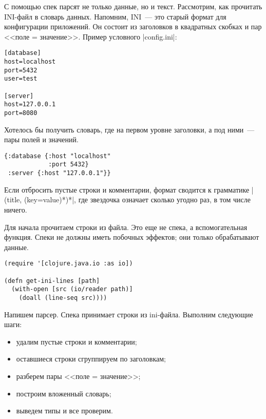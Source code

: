 С помощью спек парсят не только данные, но и текст. Рассмотрим, как прочитать
INI-файл в словарь данных. Напомним, INI~--- это старый формат для конфигурации
приложений. Он состоит из заголовков в квадратных скобках и пар <<поле =
значение>>. Пример условного \spverb|config.ini|:

\begin{verbatim}
[database]
host=localhost
port=5432
user=test

[server]
host=127.0.0.1
port=8080
\end{verbatim}

Хотелось бы получить словарь, где на первом уровне заголовки, а под ними~---
пары полей и значений.

\begin{verbatim}
{:database {:host "localhost"
            :port 5432}
 :server {:host "127.0.0.1"}}
\end{verbatim}

Если отбросить пустые строки и комментарии, формат сводится к грамматике
\spverb|(title, (key=value)*)*|, где звездочка означает сколько угодно раз, в
том числе ничего.

Для начала прочитаем строки из файла. Это еще не спека, а вспомогательная
функция. Спеки не должны иметь побочных эффектов; они только обрабатывают
данные.

\begin{verbatim}
(require '[clojure.java.io :as io])

(defn get-ini-lines [path]
  (with-open [src (io/reader path)]
    (doall (line-seq src))))
\end{verbatim}

Напишем парсер. Спека принимает строки из ini-файла. Выполним следующие шаги:

\begin{itemize}

\item
  удалим пустые строки и комментарии;

\item
  оставшиеся строки сгруппируем по заголовкам;

\item
  разберем пары <<поле = значение>>;

\item
  построим вложенный словарь;

\item
  выведем типы и все проверим.

\end{itemize}

